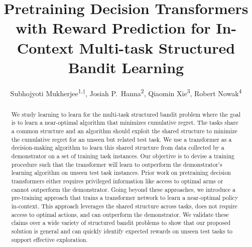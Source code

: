 \documentclass[10pt]{article}
\title{Pretraining Decision Transformers with Reward Prediction for In-Context Multi-task Structured Bandit Learning
}
\author{Subhojyoti Mukherjee\textsuperscript{1,$\dagger$}, Josiah P.\ Hanna\textsuperscript{2}, Qiaomin Xie\textsuperscript{3}, Robert Nowak\textsuperscript{4}}
\theoremstyle{plain}
\theoremstyle{definition}
\theoremstyle{remark}
\begin{document}
\makeCover
\maketitle
\begin{abstract}
We study learning to learn for the multi-task structured bandit problem where the goal is to learn a near-optimal algorithm that minimizes cumulative regret. The tasks share a common structure and an algorithm should exploit the shared structure to minimize the cumulative regret for an unseen but related test task. We use a transformer as a decision-making algorithm to learn this shared structure from data collected by a demonstrator on a set of training task instances. Our objective is to devise a training procedure such that the transformer will learn to outperform the demonstrator's learning algorithm on unseen test task instances. Prior work on pretraining decision transformers either requires privileged information like access to optimal arms or cannot outperform the demonstrator. Going beyond these approaches, we introduce a pre-training approach that trains a transformer network to learn a near-optimal policy in-context. This approach leverages the shared structure across tasks, does not require access to optimal actions, and can outperform the demonstrator. We validate these claims over a wide variety of structured bandit problems to show that our proposed solution is general and can quickly identify expected rewards on unseen test tasks to support effective exploration.
\end{abstract}
\vspace*{-0.5em}
\end{document}
